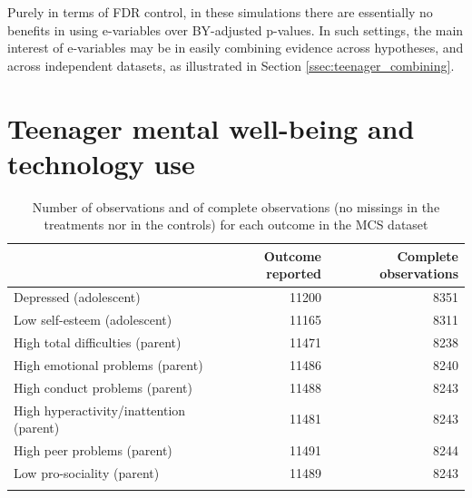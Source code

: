\documentclass[pdflatex,sn-mathphys-num]{sn-jnl}%
\theoremstyle{thmstyleone}%
\theoremstyle{thmstyletwo}%
\theoremstyle{thmstylethree}%
\begin{document}
Purely in terms of FDR control, in these simulations there are essentially no benefits in using e-variables over BY-adjusted p-values.
In such settings, the main interest of e-variables may be in easily combining evidence across hypotheses, and across independent datasets, as illustrated in Section \ref{ssec:teenager_combining}.
\color{black}


\section{Teenager mental well-being and technology use}
\label{sec:teenager}


\begin{table}[ht]
\begin{tabular}{@{}lrr@{}}
\toprule
  & Outcome reported & Complete observations \\
\midrule
 Depressed (adolescent) & 11200 & 8351 \\ 
 Low self-esteem (adolescent) & 11165 & 8311 \\ 
 High total difficulties (parent) & 11471 & 8238 \\ 
 High emotional problems (parent) & 11486 & 8240 \\ 
 High conduct problems (parent) & 11488 & 8243 \\ 
 High hyperactivity/inattention (parent) & 11481 & 8243 \\ 
 High peer problems (parent) & 11491 & 8244 \\ 
 Low pro-sociality (parent) & 11489 & 8243 \\
\botrule
\end{tabular}
\caption{\color{blue} Number of observations and of complete observations (no missings in the treatments nor in the controls) for each outcome in the MCS dataset \color{black}}
\label{tab:missings}
\end{table}
\end{document}
